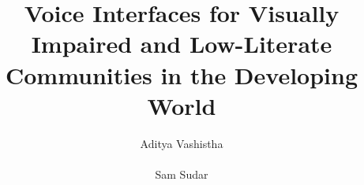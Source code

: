\documentclass{sigchi}
\begin{document}
\title{Voice Interfaces for Visually Impaired and Low-Literate Communities in the Developing World}

\author{
  \alignauthor Aditya Vashistha\\
    \\
   \alignauthor Sam Sudar\\
    \\}

\maketitle

\end{document}
